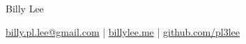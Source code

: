 \centerline{\Huge Billy Lee}

\vspace{5pt}

\centerline{\href{mailto:billy.pl.lee@gmail.com}{billy.pl.lee@gmail.com} | \href{https://billylee.me}{billylee.me} | \href{https://github.com/pl3lee}{github.com/pl3lee}}